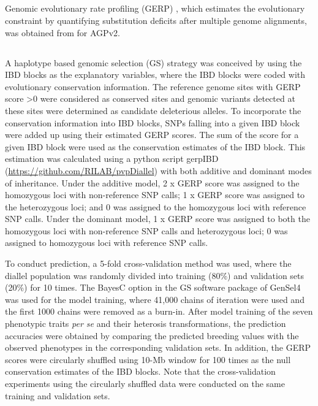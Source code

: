 \documentclass[9pt,twocolumn,twoside]{gsajnl}
\begin{document}
\DIFaddbegin 


\subsection*{}

\DIFaddend Genomic evolutionary rate profiling (GERP) \citep{Davydov2010}, which estimates the evolutionary constraint by quantifying substitution deficits after multiple genome alignments, was obtained from \citep{rodgers2015recombination} for AGPv2. 

\DIFdelbegin 
\subsection*{}

\DIFdelend A haplotype based genomic selection (GS) strategy was conceived by using the IBD blocks as the explanatory variables, where the IBD blocks were coded with evolutionary conservation information. The reference genome sites with GERP score >0 were considered as conserved sites and genomic variants detected at these sites were determined as candidate deleterious alleles. To incorporate the conservation information into IBD blocks, SNPs falling into a given IBD block were added up using their estimated GERP scores. The sum of the score for a given IBD block were used as the conservation estimates of the IBD block. This estimation was calculated using a python script gerpIBD (\url{https://github.com/RILAB/pvpDiallel}) with both additive and dominant modes of inheritance. Under the additive model, 2 x GERP score was assigned to the homozygous loci with non-reference SNP calls; 1 x GERP score was assigned to the heterozygous loci; and 0 was assigned to the homozygous loci with reference SNP calls. Under the dominant model, 1 x GERP score was assigned to both the homozygous loci with non-reference SNP calls and heterozygous loci; 0 was assigned to homozygous loci with reference SNP calls.

To conduct prediction, a 5-fold cross-validation method was used, where the diallel population was randomly divided into training (80\%) and validation sets (20\%) for 10 times. The BayesC option in the GS software package of GenSel4 \citep{habier2011extension} was used for the model training, where 41,000 chains of iteration were used and the first 1000 chains were removed as a burn-in. After model training of the seven phenotypic traits \emph{per se} and their heterosis transformations, the prediction accuracies were obtained by comparing the predicted breeding values with the observed phenotypes in the corresponding validation sets. In addition, the GERP scores were circularly shuffled using 10-Mb window for 100 times as the null conservation estimates of the IBD blocks. Note that the cross-validation experiments using the circularly shuffled data were conducted on the same training and validation sets.  
\end{document}
